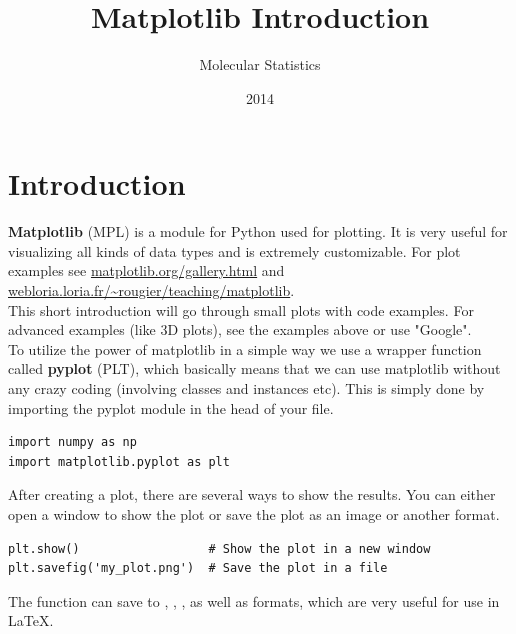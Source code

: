 \documentclass{article}
\title{Matplotlib Introduction}
\author{Molecular Statistics}
\date{2014}
\begin{document}

\maketitle

\section{Introduction}

{\bf Matplotlib} (MPL) is a module for Python used for plotting.
It is very useful for visualizing all kinds of data types and is extremely customizable.
For plot examples see 
\href{http://matplotlib.org/gallery.html}{matplotlib.org/gallery.html} and
\href{http://webloria.loria.fr/~rougier/teaching/matplotlib/}{webloria.loria.fr/\~{}rougier/teaching/matplotlib}. \\

This short introduction will go through small plots with code examples. For advanced examples (like 3D plots), see the examples above or use "Google".\\

To utilize the power of matplotlib in a simple way we use a wrapper function called {\bf pyplot} (PLT), which basically means that we can use matplotlib without any crazy coding (involving classes and instances etc).
This is simply done by importing the pyplot module in the head of your  file.

\begin{lstlisting}
import numpy as np
import matplotlib.pyplot as plt
\end{lstlisting}

After creating a plot, there are several ways to show the results. You can either open a window to show the plot or save the plot as an image or another format.

\begin{lstlisting}
plt.show()                  # Show the plot in a new window
plt.savefig('my_plot.png')  # Save the plot in a file
\end{lstlisting}


The  function can save to
,
,
,
as well as
 formats, which are very useful for use in {\LaTeX}.\\
\end{document}

